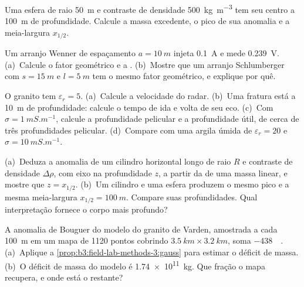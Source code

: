 \begin{exercise}[$\star$]\label{exo:b3:field-lab-methods-3:2}
Uma esfera de raio \qty{50}{m} e contraste de densidade
\qty{+500}{kg.m^{-3}} tem seu centro a \qty{100}{m} de profundidade. Calcule
a massa excedente, o pico de sua anomalia e a meia-largura $x_{1/2}$.
\end{exercise}

\begin{exercise}[$\star$]\label{exo:b3:field-lab-methods-3:3}
Um arranjo Wenner de espaçamento $a = \qty{10}{m}$ injeta \qty{0.1}{A} e
mede \qty{0.239}{V}. (a)~Calcule o fator geométrico e a
. (b)~Mostre que um arranjo Schlumberger com $s =
\qty{15}{m}$ e $l = \qty{5}{m}$ tem o mesmo fator geométrico, e
explique por quê.
\end{exercise}

\begin{exercise}[$\star$]\label{exo:b3:field-lab-methods-3:4}
O granito tem $\varepsilon_r = 5$. (a)~Calcule a velocidade do radar. (b)~Uma
fratura está a \qty{10}{m} de profundidade: calcule o tempo de ida e volta de seu eco.
(c)~Com $\sigma = \qty{1}{mS.m^{-1}}$, calcule a profundidade pelicular e a
profundidade útil, de cerca de três profundidades pelicular. (d)~Compare com uma argila úmida de
$\varepsilon_r = 20$ e $\sigma = \qty{10}{mS.m^{-1}}$.
\end{exercise}

\begin{exercise}[$\star\star$]\label{exo:b3:field-lab-methods-3:5}
(a)~Deduza a anomalia de um cilindro horizontal longo de raio $R$ e
contraste de densidade $\Delta\rho$, com eixo na profundidade $z$, a partir da de uma
massa linear, e mostre que $z = x_{1/2}$. (b)~Um cilindro e uma esfera
produzem o mesmo pico e a mesma meia-largura $x_{1/2} = \qty{100}{m}$.
Compare suas profundidades. Qual interpretação fornece o corpo mais profundo?
\end{exercise}

\begin{exercise}[$\star\star$]\label{exo:b3:field-lab-methods-3:6}
A anomalia de Bouguer do modelo do granito de Varden, amostrada a cada
\qty{100}{m} em um mapa de \num{1120} pontos cobrindo $\qty{3.5}{km}
\times \qty{3.2}{km}$, soma \qty{-438}{\milli\gal}. (a)~Aplique
a \cref{prop:b3:field-lab-methods-3:gauss} para estimar o déficit de massa.
(b)~O déficit de massa do modelo é \qty{1.74e11}{kg}. Que fração
o mapa recupera, e onde está o restante?
\end{exercise}

